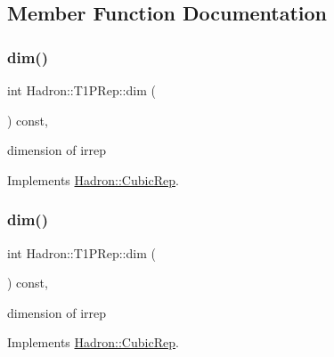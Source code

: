 \subsection{Member Function Documentation}
\mbox{\label{structHadron_1_1T1PRep_a9ebdff20792657655e3b0fd4ad1eacfc}} 
\subsubsection{\texorpdfstring{dim()}{dim()}\hspace{0.1cm}{\footnotesize\ttfamily [1/3]}}
{\footnotesize\ttfamily int Hadron\+::\+T1\+P\+Rep\+::dim (\begin{DoxyParamCaption}{ }\end{DoxyParamCaption}) const\hspace{0.3cm}{\ttfamily [inline]}, {\ttfamily [virtual]}}

dimension of irrep 

Implements \mbox{\hyperlink{structHadron_1_1CubicRep_ac178d14064f037a66af4b9fb4b312d51}{Hadron\+::\+Cubic\+Rep}}.

\mbox{\label{structHadron_1_1T1PRep_a9ebdff20792657655e3b0fd4ad1eacfc}} 
\subsubsection{\texorpdfstring{dim()}{dim()}\hspace{0.1cm}{\footnotesize\ttfamily [2/3]}}
{\footnotesize\ttfamily int Hadron\+::\+T1\+P\+Rep\+::dim (\begin{DoxyParamCaption}{ }\end{DoxyParamCaption}) const\hspace{0.3cm}{\ttfamily [inline]}, {\ttfamily [virtual]}}

dimension of irrep 

Implements \mbox{\hyperlink{structHadron_1_1CubicRep_ac178d14064f037a66af4b9fb4b312d51}{Hadron\+::\+Cubic\+Rep}}.

\mbox{\label{structHadron_1_1T1PRep_a9ebdff20792657655e3b0fd4ad1eacfc}} 
